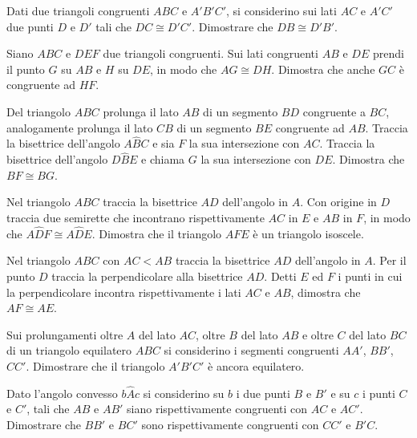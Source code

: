 \begin{multicols}{2}
\begin{esercizio}
\label{ese:2.12}
Dati due triangoli congruenti $ABC$ e $A'B'C'$, si considerino sui 
lati $AC$ e $A'C'$ due punti $D$ e $D'$ tali che $DC\cong D'C'$.  
Dimostrare che $DB\cong D'B'$.
\end{esercizio}

\begin{esercizio}
\label{ese:2.13}
Siano $ABC$ e $DEF$ due triangoli congruenti. Sui lati congruenti 
$AB$ e $DE$ prendi il punto $G$ su $AB$ e $H$ su $DE$, in modo che 
$AG\cong DH$. Dimostra che anche $GC$ è congruente ad $HF$.
\end{esercizio}

\begin{esercizio}
\label{ese:2.14}
Del triangolo $ABC$ prolunga il lato $AB$ di un segmento $BD$ 
congruente a $BC$, analogamente prolunga il lato $CB$ di un segmento 
$BE$ congruente ad $AB$. Traccia la bisettrice dell'angolo 
$A\widehat{B}C$ e sia $F$ la sua intersezione con $AC$. Traccia la 
bisettrice dell'angolo $D\widehat{B}E$ e chiama $G$ la sua 
intersezione con $DE$. Dimostra che $BF\cong BG$.
\end{esercizio}

\begin{esercizio}
\label{ese:2.15}
Nel triangolo $ABC$ traccia la bisettrice $AD$ dell'angolo in $A$. 
Con origine in $D$ traccia due semirette che incontrano 
rispettivamente $AC$ in $E$ e $AB$ in $F$, in modo che 
$A\widehat{D}F\cong A\widehat{D}E$. Dimostra che il triangolo $AFE$ è 
un triangolo isoscele.
\end{esercizio}

\begin{esercizio}
\label{ese:2.16}
Nel triangolo $ABC$ con $AC<AB$ traccia la bisettrice $AD$ 
dell'angolo in $A$. Per il punto $D$ traccia la perpendicolare alla 
bisettrice $AD$. Detti $E$ ed $F$ i punti in cui la perpendicolare 
incontra rispettivamente i lati $AC$ e $AB$, dimostra che $AF\cong 
AE$.
\end{esercizio}

\begin{esercizio}
\label{ese:2.17}
Sui prolungamenti oltre $A$ del lato $AC$, oltre $B$ del lato $AB$ e 
oltre $C$ del lato $BC$ di un triangolo equilatero $ABC$ si 
considerino i segmenti congruenti $AA'$, $BB'$, $CC'$. Dimostrare che 
il triangolo $A'B'C'$ è ancora equilatero.
\end{esercizio}

\begin{esercizio}
\label{ese:2.18}
Dato l'angolo convesso $b\widehat{A}c$ si considerino su $b$ i due 
punti $B$ e $B'$ e su $c$ i punti $C$ e $C'$, tali che $AB$ e $AB'$ 
siano rispettivamente congruenti con $AC$ e $AC'$. Dimostrare che 
$BB'$ e $BC'$ sono rispettivamente congruenti con $CC'$ e $B'C$.
\end{esercizio}


\end{multicols}
